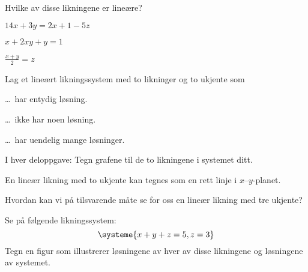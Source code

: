 \oppgaver

\begin{oppgave}
Hvilke av disse likningene er lineære?
\begin{punkt}
$14x + 3y = 2x + 1 - 5z$
\end{punkt}
\begin{punkt}
$x + 2xy + y = 1$
\end{punkt}
\begin{punkt}
$\frac{x + y}{2} = z$
\end{punkt}
\end{oppgave}


\begin{oppgave}
Lag et lineært likningssystem med to likninger og to ukjente som
\begin{punkt}
\ldots\ har entydig løsning.
\end{punkt}
\begin{punkt}
\ldots\ ikke har noen løsning.
\end{punkt}
\begin{punkt}
\ldots\ har uendelig mange løsninger.
\end{punkt}
\smallskip\noindent
I hver deloppgave: Tegn grafene til de to likningene i systemet ditt.
\end{oppgave}


\begin{oppgave}
En lineær likning med to ukjente kan tegnes som en rett linje i $x$--$y$-planet.
\begin{punkt}
Hvordan kan vi på tilsvarende måte se for oss en lineær likning med tre ukjente?
\end{punkt}
\begin{punkt}
Se på følgende likningssystem:
\[
\systeme{
  x + y + z = 5,
  z = 3
}
\]
Tegn en figur som illustrerer løsningene av hver av disse likningene
og løsningene av systemet.
\end{punkt}
\end{oppgave}
